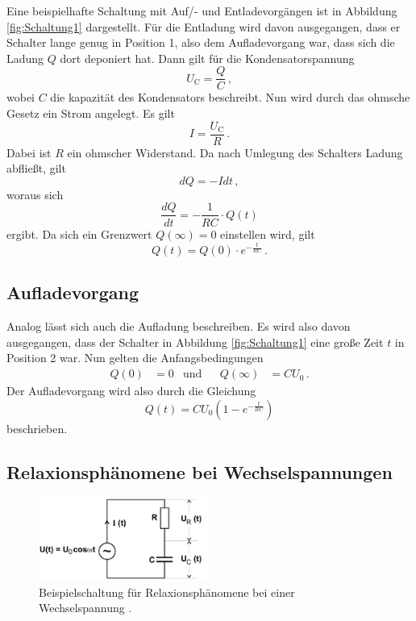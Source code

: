 Eine beispielhafte Schaltung mit Auf/- und Entladevorgängen ist in Abbildung \ref{fig:Schaltung1} dargestellt.
Für die Entladung wird davon ausgegangen, dass er Schalter lange genug in Position 1, also dem Aufladevorgang war,
dass sich die Ladung $Q$ dort deponiert hat.
Dann gilt für die Kondensatorspannung
\begin{equation}
    U_\text{C} = \frac{Q}{C} \, ,
\end{equation}
wobei $C$ die kapazität des Kondensators beschreibt.
Nun wird durch das ohmsche Gesetz ein Strom angelegt. Es gilt
\begin{equation}
    I = \frac{U_\text{C}}{R} \, .
\end{equation}
Dabei ist $R$ ein ohmscher Widerstand.
Da nach Umlegung des Schalters Ladung abfließt, gilt
\begin{equation*}
    dQ = -I dt \, ,
\end{equation*}
woraus sich 
\begin{equation*}
    \frac{dQ}{dt} = -\frac{1}{R C} \cdot Q(t)
\end{equation*}
ergibt. Da sich ein Grenzwert $Q(\infty) = 0$ einstellen wird, gilt
\begin{equation} \label{eq:entladung}
    Q(t) = Q(0) \cdot e^{- \frac{t}{R C}} \, .
\end{equation}

\subsection{Aufladevorgang}

Analog lässt sich auch die Aufladung beschreiben.
Es wird also davon ausgegangen, dass der Schalter in Abbildung \ref{fig:Schaltung1} eine große Zeit $t$ in
Position 2 war.
Nun gelten die Anfangsbedingungen
\begin{align*}
    Q(0) &= 0 & \text{und} & & Q(\infty) &= C U_0 \, .
\end{align*}
Der Aufladevorgang wird also durch die Gleichung 
\begin{equation}
    Q(t) = C U_0 (1 - e^{- \frac{t}{R C}})
\end{equation}
beschrieben.

\subsection{Relaxionsphänomene bei Wechselspannungen}
\begin{figure}
    \centering
    \includegraphics[width=0.5\textwidth]{pictures/Schaltung2.png}
    \caption{Beispielschaltung für Relaxionsphänomene bei einer Wechselspannung \cite[3]{v353}.}
    \label{fig:Schaltung2}
\end{figure}

